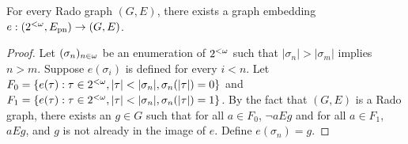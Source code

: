 \begin{lemma}[$\RCA_0$]\label{thm:graph-embedding-cantor-exists}
For every Rado graph $(G, E)$,
there exists a graph embedding $e: (2^{<\omega}, E_{\mathrm{pn}}) \to (G, E)$.
\end{lemma}
\begin{proof}
  Let $(\sigma_n)_{n\in\omega}$ be an enumeration of ${2^{<\omega}}$ such that $|\sigma_n|>|\sigma_m|$ implies $n>m$. Suppose $e(\sigma_i)$ is defined for every $i<n$. Let $F_0=\{e(\tau):\tau\in\cantor, |\tau|<|\sigma_n|, \sigma_n(|\tau|)=0\}$ and $F_1=\{e(\tau):\tau\in\cantor, |\tau|<|\sigma_n|, \sigma_n(|\tau|)=1\}$. By the fact that $(G,E)$ is a Rado graph, there exists an $g\in G$ such that for all $a\in F_0$, $\lnot aEg$ and for all $a\in F_1$, $aEg$, and $g$ is not already in the image of $e$. Define $e(\sigma_n)=g$.
\end{proof}

